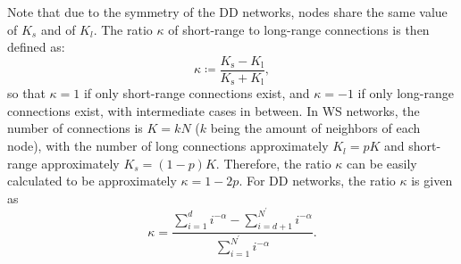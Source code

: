 Note that due to the symmetry of the DD networks, nodes share the same value of $K_s$ and of $K_l$. The ratio $\kappa$ of short-range to long-range connections is then defined as:
%
\begin{equation}
    \kappa \coloneqq \frac{ K_\mathrm{s} - K_\mathrm{l} }{ K_\mathrm{s} + K_\mathrm{l} },
\end{equation}
so that $\kappa = 1$ if only short-range connections exist, and $\kappa = -1$ if only long-range connections exist, with intermediate cases in between. In WS networks, the number of connections is $K = kN$ ($k$ being the amount of neighbors of each node), with the number of long connections approximately $K_l = pK$ and short-range approximately $K_s = (1-p)K$. Therefore, the ratio $\kappa$ can be easily calculated to be approximately $\kappa = 1 - 2p$. For DD networks, the ratio $\kappa$ is given as 
%
\begin{equation}
    \kappa = \frac{ \sum_{i=1}^d i^{-\alpha} - \sum_{i=d+1}^{N^\prime} i^{-\alpha} }{\sum_{i=1}^{N^\prime} i^{-\alpha}  }.
\end{equation}



